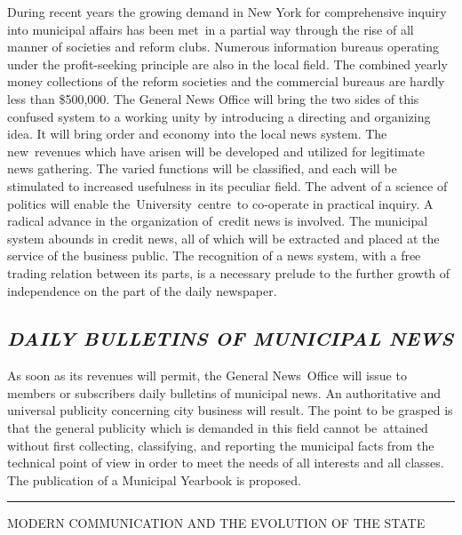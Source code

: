 \documentclass[twoside,symmetric,nobib,justified]{tufte-book}
\begin{document}
During recent years the growing demand in New York for comprehensive
inquiry into municipal affairs has been met~in a partial way through the
rise of all manner of societies and reform clubs. Numerous information
bureaus operating under the profit-seeking principle are also in the
local field. The combined yearly money collections of the reform
societies and the commercial bureaus are hardly less than \$500,000. The
General News Office will bring the two sides of this confused system to
a working unity by introducing a directing and organizing idea. It will
bring order and economy into the local news system. The new~revenues
which have arisen will be developed and utilized for legitimate news
gathering. The varied functions will be classified, and each will be
stimulated to increased usefulness in its peculiar field. The advent of
a science of politics will enable the~University~centre~to co-operate in
practical inquiry. A radical advance in the organization of~credit news
is involved. The municipal system abounds in credit news, all of which
will be extracted and placed at the service of the business public. The
recognition of a news system, with a free trading relation between its
parts, is a necessary prelude to the further growth of independence on
the part of the daily newspaper.~

\hypertarget{daily-bulletins-of-municipal-news}{%
\subsection{\emph{DAILY BULLETINS OF MUNICIPAL
NEWS}}\label{daily-bulletins-of-municipal-news}}

As soon as its revenues will permit, the General News~Office will issue
to members or subscribers daily bulletins of municipal news. An
authoritative and universal publicity concerning city business will
result. The point to be grasped is that the general publicity which is
demanded in this field cannot be~attained without first collecting,
classifying, and reporting the municipal facts from the technical point
of view in order to meet the needs of all interests and all classes. The
publication of a Municipal Yearbook is proposed.~

\begin{center}
    \vspace{0.2in}
    \noindent\rule{2in}{0.5pt}
    \vspace{0.2in}
\end{center}


\begin{center}

\begin{spacing}{1.25}
    

{\LARGE MODERN COMMUNICATION AND THE EVOLUTION OF THE
STATE}

\end{spacing}

\end{center}
\end{document}

